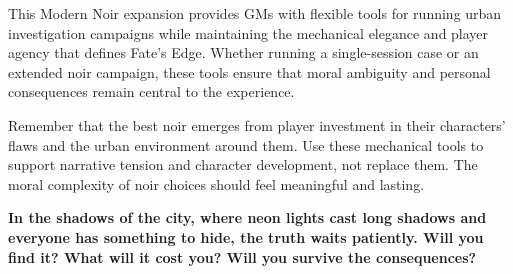 \documentclass[11pt]{article}
\begin{document}
This Modern Noir expansion provides GMs with flexible tools for running urban investigation campaigns while maintaining the mechanical elegance and player agency that defines Fate's Edge. Whether running a single-session case or an extended noir campaign, these tools ensure that moral ambiguity and personal consequences remain central to the experience.

Remember that the best noir emerges from player investment in their characters' flaws and the urban environment around them. Use these mechanical tools to support narrative tension and character development, not replace them. The moral complexity of noir choices should feel meaningful and lasting.

\begin{center}
\textbf{In the shadows of the city, where neon lights cast long shadows and everyone has something to hide, the truth waits patiently. Will you find it? What will it cost you? Will you survive the consequences?}
\end{center}
\end{document}
